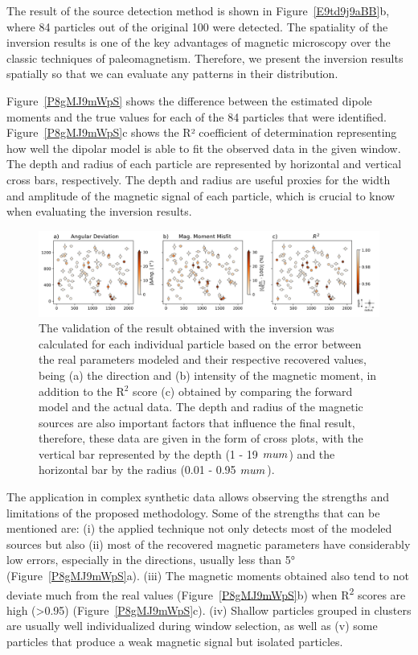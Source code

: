 The result of the source detection method is shown in Figure~\ref{E9td9j9aBB}b,
where 84 particles out of the original 100 were detected. The spatiality of the
inversion results is one of the key advantages of magnetic microscopy over the
classic techniques of paleomagnetism. Therefore, we present the inversion
results spatially so that we can evaluate any patterns in their distribution.

Figure~\ref{P8gMJ9mWpS} shows the difference between the estimated dipole
moments and the true values for each of the 84 particles that were identified.
Figure~\ref{P8gMJ9mWpS}c shows the R² coefficient of determination representing
how well the dipolar model is able to fit the observed data in the given
window. The depth and radius of each particle are represented by horizontal and
vertical cross bars, respectively. The depth and radius are useful proxies for
the width and amplitude of the magnetic signal of each particle, which is
crucial to know when evaluating the inversion results.

\begin{figure}[t]
\centering
\includegraphics[width=1\linewidth]{figures/ComplexComparison.png}
\caption{
The validation of the result obtained with the inversion was calculated for
each individual particle based on the error between the real parameters modeled
and their respective recovered values, being (a) the direction and (b)
intensity of the magnetic moment, in addition to the R$^2$ score (c) obtained
by comparing the forward model and the actual data. The depth and radius of the
magnetic sources are also important factors that influence the final result,
therefore, these data are given in the form of cross plots, with the vertical
bar represented by the depth (1 - 19 $\\mu m$) and the horizontal bar by the
radius (0.01 - 0.95 $\\mu m$).
}
\label{p8gmj9mwps}
\end{figure}

The application in complex synthetic data allows observing the strengths and
limitations of the proposed methodology. Some of the strengths that can be
mentioned are: (i) the applied technique not only detects most of the modeled
sources but also (ii) most of the recovered magnetic parameters have
considerably low errors, especially in the directions, usually less than 5°
(Figure~\ref{P8gMJ9mWpS}a). (iii) The magnetic moments obtained also tend to
not deviate much from the real values (Figure~\ref{P8gMJ9mWpS}b) when
R\textsuperscript{2} scores are high (\textgreater 0.95)
(Figure~\ref{P8gMJ9mWpS}c). (iv) Shallow particles grouped in clusters are
usually well individualized during window selection, as well as (v) some
particles that produce a weak magnetic signal but isolated particles.

